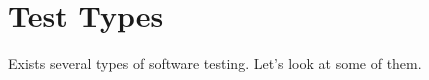 \section{Test Types}
\label{sec:testing-types}

Exists several types of software testing. Let's look at some of them.




